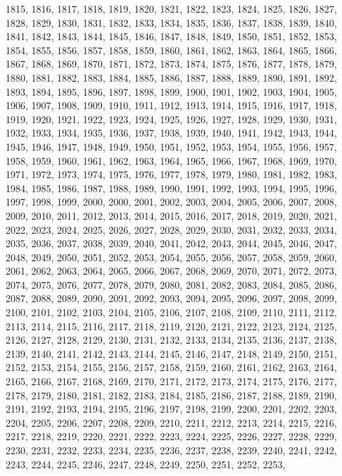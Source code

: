 \documentclass[a4paper,11pt]{article}
\begin{document}
1815, 1816, 1817, 1818, 1819, 1820, 1821, 1822, 1823, 1824, 1825,
1826, 1827, 1828, 1829, 1830, 1831, 1832, 1833, 1834, 1835, 1836,
1837, 1838, 1839, 1840, 1841, 1842, 1843, 1844, 1845, 1846, 1847,
1848, 1849, 1850, 1851, 1852, 1853, 1854, 1855, 1856, 1857, 1858,
1859, 1860, 1861, 1862, 1863, 1864, 1865, 1866, 1867, 1868, 1869,
1870, 1871, 1872, 1873, 1874, 1875, 1876, 1877, 1878, 1879, 1880,
1881, 1882, 1883, 1884, 1885, 1886, 1887, 1888, 1889, 1890, 1891,
1892, 1893, 1894, 1895, 1896, 1897, 1898, 1899, 1900, 1901, 1902,
1903, 1904, 1905, 1906, 1907, 1908, 1909, 1910, 1911, 1912, 1913,
1914, 1915, 1916, 1917, 1918, 1919, 1920, 1921, 1922, 1923, 1924,
1925, 1926, 1927, 1928, 1929, 1930, 1931, 1932, 1933, 1934, 1935,
1936, 1937, 1938, 1939, 1940, 1941, 1942, 1943, 1944, 1945, 1946,
1947, 1948, 1949, 1950, 1951, 1952, 1953, 1954, 1955, 1956, 1957,
1958, 1959, 1960, 1961, 1962, 1963, 1964, 1965, 1966, 1967, 1968,
1969, 1970, 1971, 1972, 1973, 1974, 1975, 1976, 1977, 1978, 1979,
1980, 1981, 1982, 1983, 1984, 1985, 1986, 1987, 1988, 1989, 1990,
1991, 1992, 1993, 1994, 1995, 1996, 1997, 1998, 1999, 2000, 2000,
2001, 2002, 2003, 2004, 2005, 2006, 2007, 2008, 2009, 2010, 2011,
2012, 2013, 2014, 2015, 2016, 2017, 2018, 2019, 2020, 2021, 2022,
2023, 2024, 2025, 2026, 2027, 2028, 2029, 2030, 2031, 2032, 2033,
2034, 2035, 2036, 2037, 2038, 2039, 2040, 2041, 2042, 2043, 2044,
2045, 2046, 2047, 2048, 2049, 2050, 2051, 2052, 2053, 2054, 2055,
2056, 2057, 2058, 2059, 2060, 2061, 2062, 2063, 2064, 2065, 2066,
2067, 2068, 2069, 2070, 2071, 2072, 2073, 2074, 2075, 2076, 2077,
2078, 2079, 2080, 2081, 2082, 2083, 2084, 2085, 2086, 2087, 2088,
2089, 2090, 2091, 2092, 2093, 2094, 2095, 2096, 2097, 2098, 2099,
2100, 2101, 2102, 2103, 2104, 2105, 2106, 2107, 2108, 2109, 2110,
2111, 2112, 2113, 2114, 2115, 2116, 2117, 2118, 2119, 2120, 2121,
2122, 2123, 2124, 2125, 2126, 2127, 2128, 2129, 2130, 2131, 2132,
2133, 2134, 2135, 2136, 2137, 2138, 2139, 2140, 2141, 2142, 2143,
2144, 2145, 2146, 2147, 2148, 2149, 2150, 2151, 2152, 2153, 2154,
2155, 2156, 2157, 2158, 2159, 2160, 2161, 2162, 2163, 2164, 2165,
2166, 2167, 2168, 2169, 2170, 2171, 2172, 2173, 2174, 2175, 2176,
2177, 2178, 2179, 2180, 2181, 2182, 2183, 2184, 2185, 2186, 2187,
2188, 2189, 2190, 2191, 2192, 2193, 2194, 2195, 2196, 2197, 2198,
2199, 2200, 2201, 2202, 2203, 2204, 2205, 2206, 2207, 2208, 2209,
2210, 2211, 2212, 2213, 2214, 2215, 2216, 2217, 2218, 2219, 2220,
2221, 2222, 2223, 2224, 2225, 2226, 2227, 2228, 2229, 2230, 2231,
2232, 2233, 2234, 2235, 2236, 2237, 2238, 2239, 2240, 2241, 2242,
2243, 2244, 2245, 2246, 2247, 2248, 2249, 2250, 2251, 2252, 2253,
\end{document}
